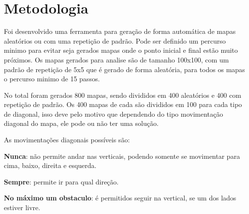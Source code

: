 \chapter[Metodologia]{Metodologia}

Foi desenvolvido uma ferramenta para geração de forma automática de mapas aleatórios ou com uma repetição de padrão. Pode ser definido um percurso minimo para evitar seja gerados mapas onde o ponto inicial e final estão muito próximos.
Os mapas gerados para analise são de tamanho 100x100, com um padrão de repetição de 5x5 que é gerado de forma aleatória, para todos os mapas o percurso minimo de 15 passos.

No total foram gerados 800 mapas, sendo divididos em 400 aleatórios e 400 com repetição de padrão.
Os 400 mapas de cada são divididos em 100 para cada tipo de diagonal, isso deve pelo motivo que dependendo do tipo movimentação diagonal do mapa, ele pode ou não ter uma solução.

As movimentações diagonais possíveis são:

\textbf{Nunca}: não permite andar nas verticais, podendo somente se movimentar para cima, baixo, direita e esquerda.

\textbf{Sempre}: permite ir para qual direção.

\begin{minipage}{\linewidth}
    \label{fig:d_aways}
\end{minipage}

\textbf{No máximo um obstaculo}: é permitidos seguir na vertical, se um dos lados estiver livre.

\begin{minipage}{\linewidth}
    \label{fig:d_one}
\end{minipage}


